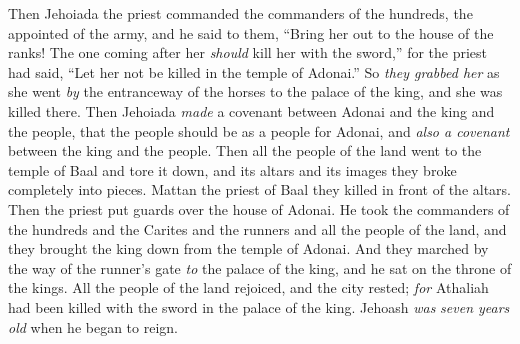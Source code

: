 \begin{biblechapter}
\verse Then Jehoiada the priest commanded the commanders of the hundreds, the appointed of the army, and he said to them, “Bring her out to the house of the ranks! The one coming after her \textit{should} kill her with the sword,” for the priest had said, “Let her not be killed in the temple of Adonai.”
\verse So \textit{they grabbed her} as she went \textit{by} the entranceway of the horses to the palace of the king, and she was killed there.
\verse Then Jehoiada \textit{made} a covenant between Adonai and the king and the people, that the people should be as a people for Adonai, and \textit{also a covenant} between the king and the people.
\verse Then all the people of the land went to the temple of Baal and tore it down, and its altars and its images they broke completely into pieces. Mattan the priest of Baal they killed in front of the altars. Then the priest put guards over the house of Adonai.
\verse He took the commanders of the hundreds and the Carites and the runners and all the people of the land, and they brought the king down from the temple of Adonai. And they marched by the way of the runner’s gate \textit{to} the palace of the king, and he sat on the throne of the kings.
\verse All the people of the land rejoiced, and the city rested; \textit{for} Athaliah had been killed with the sword in the palace of the king.
\verse  Jehoash \textit{was} \textit{seven years old} when he began to reign.
\end{biblechapter}

